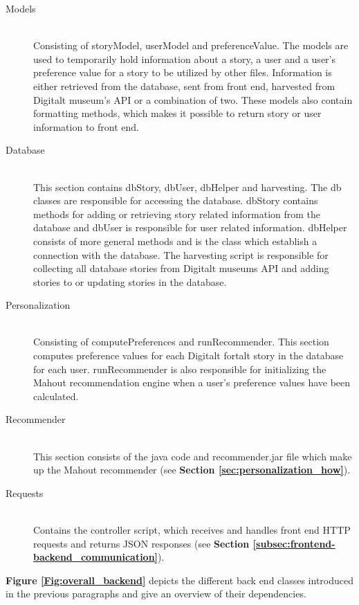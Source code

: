 \begin{description}
	\item[Models] \hfill \\
	Consisting of storyModel, userModel and preferenceValue. The models are used to temporarily hold information about a story, a user and a user’s preference value for a story to be utilized by other files. Information is either retrieved from the database, sent from front end, harvested from Digitalt museum’s API or a combination of two. These models also contain formatting methods, which makes it possible to return story or user information to front end.
	
	\item[Database] \hfill \\
	This section contains dbStory, dbUser, dbHelper and harvesting. The db classes are responsible for accessing the database. dbStory contains methods for adding or retrieving story related information from the database and dbUser is responsible for user related information. dbHelper consists of more general methods and is the class which establish a connection with the database. The harvesting script is responsible for collecting all database stories from Digitalt museums API and adding stories to or updating stories in the database. 

	\item[Personalization] \hfill \\
	Consisting of computePreferences and runRecommender. This section computes preference values for each Digitalt fortalt story in the database for each user. runRecommender is also responsible for initializing the Mahout recommendation engine when a user’s preference values have been calculated.
	
	\item[Recommender] \hfill \\
	This section consists of the java code and recommender.jar file which make up the Mahout recommender (see \textbf{Section \ref{sec:personalization_how}}).
	
	\item[Requests] \hfill \\
	Contains the controller script, which receives and handles front end HTTP requests and returns JSON responses (see \textbf{Section \ref{subsec:frontend-backend_communication}}).
	
\end{description}
	
\textbf{Figure \ref{Fig:overall_backend}} depicts the different back end classes introduced in the previous paragraphs and give an overview of their dependencies.

